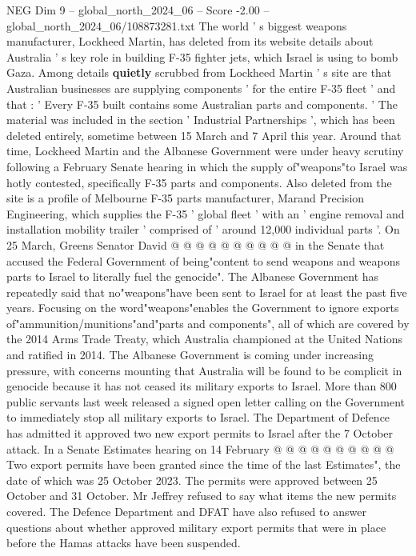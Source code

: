 \begin{textsample}{NEG Dim 9 – global\_north\_2024\_06 – Score -2.00 – global\_north\_2024\_06/108873281.txt}  \label{ex:f9_neg_174}
The world ' s biggest weapons manufacturer, Lockheed Martin, has deleted from its website details about Australia ' s key role in building F-35 fighter jets, which Israel is using to bomb Gaza.
Among details \textbf{quietly} scrubbed from Lockheed Martin ' s site are that Australian businesses are supplying components ' for the entire F-35 fleet ' and that : ' Every F-35 built contains some Australian parts and components. ' The material was included in the section ' Industrial Partnerships ', which has been deleted entirely, sometime between 15 March and 7 April this year.
Around that time, Lockheed Martin and the Albanese Government were under heavy scrutiny following a February Senate hearing in which the supply of"weapons"to Israel was hotly contested, specifically F-35 parts and components.
Also deleted from the site is a profile of Melbourne F-35 parts manufacturer, Marand Precision Engineering, which supplies the F-35 ' global fleet ' with an ' engine removal and installation mobility trailer ' comprised of ' around 12,000 individual parts '.
On 25 March, Greens Senator David @ @ @ @ @ @ @ @ @ @ in the Senate that accused the Federal Government of being"content to send weapons and weapons parts to Israel to literally fuel the genocide".
The Albanese Government has repeatedly said that no"weapons"have been sent to Israel for at least the past five years.
Focusing on the word"weapons"enables the Government to ignore exports of"ammunition/munitions"and"parts and components", all of which are covered by the 2014 Arms Trade Treaty, which Australia championed at the United Nations and ratified in 2014.
The Albanese Government is coming under increasing pressure, with concerns mounting that Australia will be found to be complicit in genocide because it has not ceased its military exports to Israel.
More than 800 public servants last week released a signed open letter calling on the Government to immediately stop all military exports to Israel.
The Department of Defence has admitted it approved two new export permits to Israel after the 7 October attack.
In a Senate Estimates hearing on 14 February @ @ @ @ @ @ @ @ @ @ Two export permits have been granted since the time of the last Estimates", the date of which was 25 October 2023.
The permits were approved between 25 October and 31 October.
Mr Jeffrey refused to say what items the new permits covered.
The Defence Department and DFAT have also refused to answer questions about whether approved military export permits that were in place before the Hamas attacks have been suspended.

\end{textsample}
